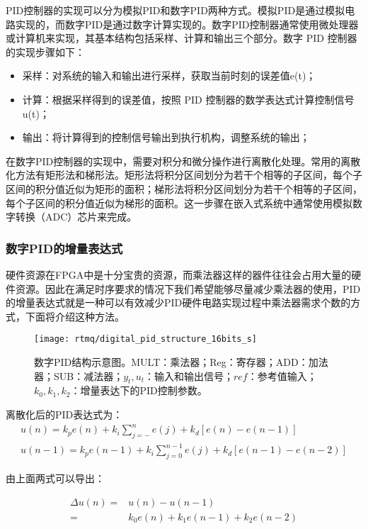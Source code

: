 PID控制器的实现可以分为模拟PID和数字PID两种方式。模拟PID是通过模拟电路实现的，而数字PID是通过数字计算实现的。数字PID控制器通常使用微处理器或计算机来实现，其基本结构包括采样、计算和输出三个部分。数字 PID 控制器的实现步骤如下：
\begin{itemize}
    \item 采样：对系统的输入和输出进行采样，获取当前时刻的误差值e(t)；
    \item 计算：根据采样得到的误差值，按照 PID 控制器的数学表达式计算控制信号u(t)；
    \item 输出：将计算得到的控制信号输出到执行机构，调整系统的输出；
\end{itemize}

在数字PID控制器的实现中，需要对积分和微分操作进行离散化处理。常用的离散化方法有矩形法和梯形法。矩形法将积分区间划分为若干个相等的子区间，每个子区间的积分值近似为矩形的面积；梯形法将积分区间划分为若干个相等的子区间，每个子区间的积分值近似为梯形的面积。这一步骤在嵌入式系统中通常使用模拟数字转换（ADC）芯片来完成。

\subsubsection[数字PID的增量表达式]{数字PID的增量表达式}
硬件资源在FPGA中是十分宝贵的资源，而乘法器这样的器件往往会占用大量的硬件资源。因此在满足时序要求的情况下我们希望能够尽量减少乘法器的使用，PID的增量表达式就是一种可以有效减少PID硬件电路实现过程中乘法器需求个数的方式，下面将介绍这种方法。

\begin{figure}
    \centering
    \caption[数字PID结构示意图]{数字PID结构示意图。MULT：乘法器；Reg：寄存器；ADD：加法器；SUB：减法器；$y_t, u_t$：输入和输出信号；$ref$：参考值输入；$k_0, k_1, k_2$：增量表达下的PID控制参数。\label{fig:digital_pid_structure_16bits_s}}
    \texttt{[image: rtmq/digital\_pid\_structure\_16bits\_s]}
\end{figure}

离散化后的PID表达式为：
\begin{align}
    u(n)=k_p e(n)+k_i\sum_{j=-}^{n}e(j)+k_d[e(n)-e(n-1)]\\
    u(n-1)=k_p e(n-1)+k_i \sum_{j=0}^{n-1}e(j)+k_d [e(n-1)-e(n-2)]
\end{align}

由上面两式可以导出：

\begin{align}
    \Delta u(n)=&u(n)-u(n-1)\\
    =&k_0 e(n)+k_1 e(n-1)+k_2 e(n-2)
\end{align}

